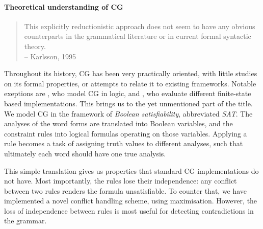 

\paragraph{Theoretical understanding of CG}

\begin{quote}
This explicitly reductionistic approach does not seem to have any obvious counterparts in the grammatical literature or in current formal syntactic theory. \\
-- Karlsson, 1995
\end{quote}

Throughout its history, CG has been very practically oriented, with 
little studies on its formal properties, or attempts to relate it to existing
frameworks.
Notable exeptions are \cite{lager_nivre01}, who model CG in logic, and \cite{nemeskey14}, who evaluate different finite-state based implementations.
This brings us to the yet unmentioned part of the title.
We model CG in the framework of \emph{Boolean satisfiability}, abbreviated \emph{SAT}.
The analyses of the word forms are translated into Boolean variables, 
and the constraint rules into logical formulas operating on those variables.
Applying a rule becomes a task of assigning truth values to different analyses,
such that ultimately each word should have one true analysis.

This simple translation gives us properties that standard CG implementations do not have.
Most importantly, the rules lose their independence: any conflict between two rules renders the formula unsatisfiable. To counter that, we have implemented a novel conflict handling scheme, using maximisation. However, the loss of independence between rules is most useful for detecting contradictions in the grammar.




